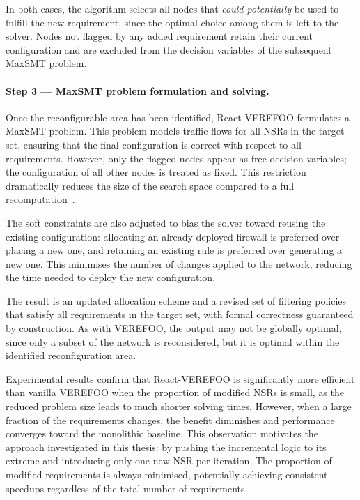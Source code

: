 In both cases, the algorithm selects all nodes that \textit{could potentially} be used to fulfill the new requirement, since the optimal choice among them is left to the solver. Nodes not flagged by any added requirement retain their current configuration and are excluded from the decision variables of the subsequent MaxSMT problem.

\paragraph{Step 3 — MaxSMT problem formulation and solving.} Once the reconfigurable area has been identified, React-VEREFOO formulates a MaxSMT problem. This problem models traffic flows for all NSRs in the target set, ensuring that the final configuration is correct with respect to all requirements. However, only the flagged nodes appear as free decision variables; the configuration of all other nodes is treated as fixed. This restriction dramatically reduces the size of the search space compared to a full recomputation~\cite{reactverefoo}.

The soft constraints are also adjusted to bias the solver toward reusing the existing configuration: allocating an already-deployed firewall is preferred over placing a new one, and retaining an existing rule is preferred over generating a new one. This minimises the number of changes applied to the network, reducing the time needed to deploy the new configuration.

The result is an updated allocation scheme and a revised set of filtering policies that satisfy all requirements in the target set, with formal correctness guaranteed by construction. As with VEREFOO, the output may not be globally optimal, since only a subset of the network is reconsidered, but it is optimal within the identified reconfiguration area.


Experimental results confirm that React-VEREFOO is significantly more efficient than vanilla VEREFOO when the proportion of modified NSRs is small, as the reduced problem size leads to much shorter solving times. However, when a large fraction of the requirements changes, the benefit diminishes and performance converges toward the monolithic baseline. This observation motivates the approach investigated in this thesis: by pushing the incremental logic to its extreme and introducing only one new NSR per iteration. The proportion of modified requirements is always minimised, potentially achieving consistent speedups regardless of the total number of requirements.
